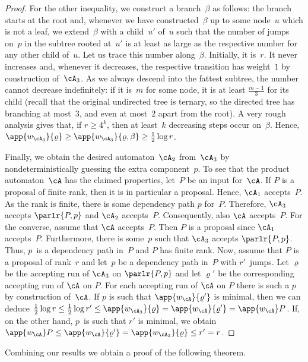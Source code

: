 \documentclass{LMCS}
\begin{document}
\begin{proof}
For the other inequality, we construct a branch~$\beta$ as follows\?:
the branch starts at the root
and, whenever we have constructed~$\beta$ up to some node~$u$
which is not a leaf, we extend~$\beta$ with a child~$u'$ of~$u$
such that the number of jumps on~$p$ in the subtree rooted at~$u'$
is at least as large as the respective number for any other child of~$u$.
Let us trace this number along~$\beta$. Initially, it is~$r$.
It never increases and, whenever it decreases,
the respective transition has weight~$1$
by construction of~$\cA_3$.
As we always descend into the fattest subtree,
the number cannot decrease indefinitely\?:
if it is~$m$ for some node, it is at least $\frac{m-1}3$ for its child
(recall that the original undirected tree is ternary,
so the directed tree has branching at most~$3$,
and even at most~$2$ apart from the root).
A very rough analysis gives that, if $r\geq 4^k$,
then at least~$k$ decreasing steps occur on~$\beta$.
Hence,
$\app{w_{\cA_3}}{\varrho}\geq\app{w_{\cA_3}}{\varrho,\beta}\geq\frac12\log r$.

Finally, we obtain the desired automaton~$\cA_2$ from~$\cA_3$
by nondeterministically guessing the extra component~$p$.
To see that the product automaton~$\cA$ has the claimed properties,
let~$P$ be an input for~$\cA$.
If $P$ is a proposal of finite rank,
then it is in particular a proposal. Hence, $\cA_1$ accepts~$P$.
As the rank is finite, there is some dependency path $p$ for~$P$.
Therefore, $\cA_3$ accepts $\parlr{P,p}$ and $\cA_2$ accepts~$P$.
Consequently, also $\cA$ accepts~$P$.
For the converse, assume that $\cA$ accepts~$P$.
Then $P$ is a proposal since $\cA_1$ accepts~$P$.
Furthermore, there is some~$p$ such that $\cA_3$ accepts $\parlr{P,p}$.
Thus, $p$~is a dependency path in~$P$ and $P$ has finite rank.
Now, assume that $P$ is a proposal of rank~$r$
and let~$p$ be a dependency path in~$P$ with $r'$~jumps.
Let $\varrho$ be the accepting run of $\cA_3$ on $\parlr{P,p}$
and let $\varrho'$ be the corresponding accepting run of $\cA$ on $P$.
For each accepting run of $\cA$ on $P$
there is such a $p$ by construction of~$\cA$.
If $p$ is such that $\app{w_{\cA}}{\varrho'}$ is minimal,
then we can deduce
$\frac12\log r\leq\frac12\log r'\leq\app{w_{\cA_3}}{\varrho}
  =\app{w_{\cA}}{\varrho'}=\app{w_{\cA}}P$.
If, on the other hand, $p$~is such that $r'$ is minimal,
we obtain
$\app{w_{\cA}}P\leq\app{w_{\cA}}{\varrho'}=\app{w_{\cA_3}}{\varrho}
  \leq r'=r$.
\end{proof}

Combining our results we obtain a proof of the following theorem.
\end{document}
